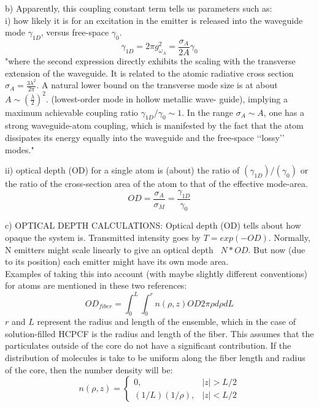 b) Apparently, this coupling constant term tells us parameters such as:\\
i) how likely it is for an excitation in the emitter is released into the waveguide mode $\gamma_{1D}$, versus free-space $\gamma_0$. \cite{mazoni}
\begin{equation}
	\gamma_{1D} = 2\pi g^2_{\omega_A}  = \frac{\sigma_A}{2A}\gamma_0
\end{equation}
"where the second expression directly exhibits the scaling with the transverse extension of the waveguide. It is related to the atomic radiative cross section $\sigma_A = \frac{3\lambda^2}{2\pi}$. A natural lower bound on the transverse mode size is at about $A \sim (\frac{\lambda}{2})^2$. (lowest-order mode in hollow metallic wave- guide), implying a maximum achievable coupling ratio $\gamma_{1D}/\gamma_0 \sim 1$. In the range $\sigma_A \sim A$, one has a strong waveguide-atom coupling, which is manifested by the fact that the atom dissipates its energy equally into the waveguide and the free-space ‘‘lossy’’ modes."\cite{domokos}

ii) optical depth (OD) for a single atom is (about) the ratio of $ (\gamma_{1D})/ (\gamma_{0})$ or the ratio of the cross-section area of the atom to that of the effective mode-area. 
\begin{equation}
 	OD = \frac{\sigma_A}{\sigma_M} = \frac{\gamma_{1D}}{\gamma_0}
\end{equation}

c) OPTICAL DEPTH CALCULATIONS: Optical depth (OD) tells about how opaque the system is. Transmitted intensity goes by $T = exp(-OD)$. Normally, N emitters might scale linearly to give an optical depth ~$N*OD$. But now (due to its position) each emitter might have its own mode area.\\

Examples of taking this into account (with maybe slightly different conventions) for atoms are mentioned in these two references\cite{bajcsy, hilton}: 
\begin{equation}
	OD_{fiber} = \int^L_0 \int^{r}_0 n(\rho, z) OD 2\pi \rho d\rho dL
\end{equation}
$r$ and $L$ represent the radius and length of the ensemble, which in the case of solution-filled HCPCF is the radius and length of the fiber. This assumes that the particulates outside of the core do not have a significant contribution.  If the distribution of molecules is take to be uniform along the fiber length and radius of the core, then the number density will be: 
\begin{equation}
	n(\rho, z) = \begin{cases}
		0, &|z| > L/2\\
		(1/L) (1/\rho), &|z| < L/2
	\end{cases}
\end{equation}

